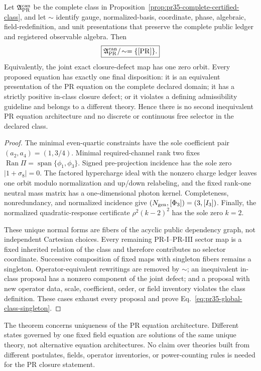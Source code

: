 \begin{theorem}
\label{thm:pr35-completed-selector-singleton}
Let $\mathfrak A_{\rm PR}^{\rm can}$ be the complete class in Proposition~\ref{prop:pr35-complete-certified-class}, and let $\sim$ identify gauge, normalized-basis, coordinate, phase, algebraic, field-redefinition, and unit presentations that preserve the complete public ledger and registered
observable algebra.  Then
\begin{equation}
 \boxed{
 \mathfrak A_{\rm PR}^{\rm can}/\!\sim
 =\{[\mathrm{PR}]\}.}
 \label{eq:pr35-global-class-singleton}
\end{equation}
Equivalently, the joint exact closure-defect map has one zero orbit.  Every proposed equation has exactly one final disposition: it is an equivalent presentation of the PR equation on the complete declared domain; it has a strictly positive in-class closure defect; or it violates a defining
admissibility guideline and belongs to a different theory.  Hence there is no second inequivalent PR equation architecture and no discrete or continuous free selector in the declared class.
\end{theorem}

\begin{proof}
The minimal even-quartic constraints have the sole coefficient pair $(a_2,a_4)=(1,3/4)$.  Minimal required-channel rank two fixes $\operatorname{Ran}\Pi=\operatorname{span}\{\phi_1,\phi_3\}$.  Signed
pre-projection incidence has the sole zero $|1+\sigma_8|=0$.  The factored hypercharge ideal with the nonzero charge ledger leaves one orbit modulo normalization and up/down relabeling, and the fixed rank-one neutral mass matrix has a one-dimensional photon kernel.  Completeness, nonredundancy, and
normalized incidence give $(N_{\rm gen},[\Phi_3])=(3,[I_3])$.  Finally, the normalized quadratic-response certificate $\rho^2(k-2)^2$ has the sole zero $k=2$.

These unique normal forms are fibers of the acyclic public dependency graph, not independent Cartesian choices.  Every remaining PR-I--PR-III sector map is a fixed inherited relation of the class and therefore contributes no selector coordinate.  Successive composition of fixed maps with singleton fibers remains a singleton.  Operator-equivalent rewritings are removed by $\sim$; an inequivalent in-class proposal has a nonzero component of the joint defect; and a proposal with new operator data, scale, coefficient, order, or field inventory violates the class definition.  These cases exhaust every proposal and prove Eq.~\eqref{eq:pr35-global-class-singleton}.
\end{proof}

The theorem concerns uniqueness of the PR equation architecture.  Different states governed by one fixed field equation are solutions of the same unique theory, not alternative equation architectures. No claim over theories built from different postulates, fields, operator inventories, or power-counting rules is needed for the PR closure statement.
